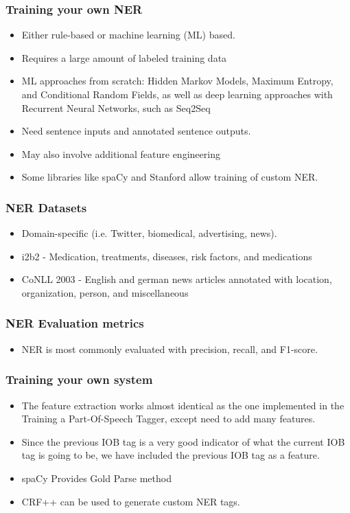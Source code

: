 \begin{frame}[fragile]\frametitle{Training your own NER}
  \begin{itemize}
  \item Either rule-based or machine learning (ML) based.
	\item Requires a large amount of labeled training data
	\item ML approaches from scratch: Hidden Markov Models, Maximum Entropy, and Conditional Random Fields, as well as deep learning approaches with Recurrent Neural Networks, such as Seq2Seq
	\item Need sentence inputs and annotated sentence outputs. 
	\item May also involve additional feature engineering
	\item Some libraries like spaCy and Stanford allow training of custom NER.
  \end{itemize}
\end{frame}


\begin{frame}[fragile]\frametitle{NER Datasets}
  \begin{itemize}
  \item Domain-specific (i.e. Twitter, biomedical, advertising, news).
	\item i2b2 - Medication, treatments, diseases, risk factors, and medications
	\item CoNLL 2003 - English and german news articles annotated with location, organization, person, and miscellaneous
  \end{itemize}
\end{frame}


\begin{frame}[fragile]\frametitle{NER Evaluation metrics}
  \begin{itemize}
  \item NER is most commonly evaluated with precision, recall, and F1-score.
  \end{itemize}
\end{frame}


\begin{frame}[fragile]\frametitle{Training your own system}
  \begin{itemize}
  \item The feature extraction works almost identical as the one implemented in the Training a Part-Of-Speech Tagger, except need to add many features.
  \item Since the previous IOB tag is a very good indicator of what the current IOB tag is going to be, we have included the previous IOB tag as a feature.
  \item spaCy Provides Gold Parse method
  \item CRF++ can be used to generate custom NER tags.
  \end{itemize}
\end{frame}

